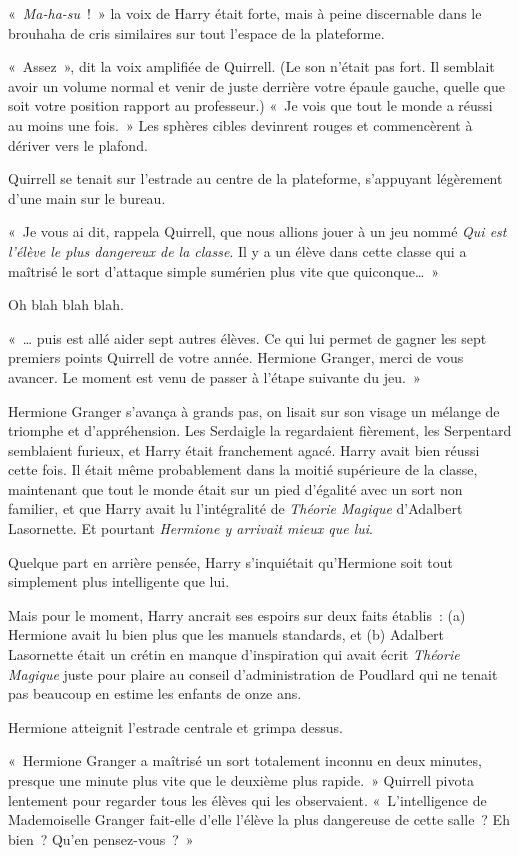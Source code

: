 «~\emph{Ma-ha-su}~!~» la voix de Harry était forte, mais à peine discernable dans le brouhaha de cris similaires sur tout l'espace de la plateforme.

«~Assez~», dit la voix amplifiée de Quirrell.
(Le son n'était pas fort. Il semblait avoir un volume normal et venir de juste derrière votre épaule gauche, quelle que soit votre position rapport au professeur.)
«~Je vois que tout le monde a réussi au moins une fois.~»
Les sphères cibles devinrent rouges et commencèrent à dériver vers le plafond.

Quirrell se tenait sur l'estrade au centre de la plateforme, s'appuyant légèrement d'une main sur le bureau.

«~Je vous ai dit, rappela Quirrell, que nous allions jouer à un jeu nommé \emph{Qui est l'élève le plus dangereux de la classe}.
Il y a un élève dans cette classe qui a maîtrisé le sort d'attaque simple sumérien plus vite que quiconque…~»

Oh blah blah blah.

«~… puis est allé aider sept autres élèves.
Ce qui lui permet de gagner les sept premiers points Quirrell de votre année.
Hermione Granger, merci de vous avancer.
Le moment est venu de passer à l'étape suivante du jeu.~»

Hermione Granger s'avança à grands pas, on lisait sur son visage un mélange de triomphe et d'appréhension.
Les Serdaigle la regardaient fièrement, les Serpentard semblaient furieux, et Harry était franchement agacé.
Harry avait bien réussi cette fois.
Il était même probablement dans la moitié supérieure de la classe, maintenant que tout le monde était sur un pied d'égalité avec un sort non familier, et que Harry avait lu l'intégralité de \emph{Théorie Magique} d'Adalbert Lasornette.
Et pourtant \emph{Hermione y arrivait mieux que lui}.

Quelque part en arrière pensée, Harry s'inquiétait qu'Hermione soit tout simplement plus intelligente que lui.

Mais pour le moment, Harry ancrait ses espoirs sur deux faits établis~: (a) Hermione avait lu bien plus que les manuels standards, et (b) Adalbert Lasornette était un crétin en manque d'inspiration qui avait écrit \emph{Théorie Magique} juste pour plaire au conseil d'administration de Poudlard qui ne tenait pas beaucoup en estime les enfants de onze ans.

Hermione atteignit l'estrade centrale et grimpa dessus.

«~Hermione Granger a maîtrisé un sort totalement inconnu en deux minutes, presque une minute plus vite que le deuxième plus rapide.~»
Quirrell pivota lentement pour regarder tous les élèves qui les observaient.
«~L'intelligence de Mademoiselle Granger fait-elle d'elle l'élève la plus dangereuse de cette salle~?
Eh bien~? Qu'en pensez-vous~?~»

